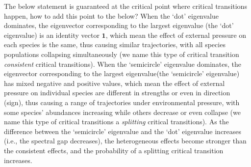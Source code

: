 \documentclass[a4paper,fleqn,12pt]{article}
\begin{document}
{\color{red}The below statement is guaranteed at the critical point where critical transitions happen, how to add this point to the below?}
When the `dot' eigenvalue dominates, the eigenvector corresponding to the largest eigenvalue (the `dot' eigenvalue) is an identity vector $\mathbf{1}$,
which mean the effect of external pressure on each species is the same,
thus causing similar trajectories, with all species populations collapsing simultaneously (we name this type of critical transition \textit{consistent} critical transitions).
When the `semicircle' eigenvalue dominates, the eigenvector corresponding to the largest eigenvalue(the `semicircle' eigenvalue) has mixed negative and positive values,
which mean the effect of external pressure on individual species are different in strengths or even in direction (sign),
thus causing a range of trajectories under environmental pressure,
with some species' abundances increasing while others decrease or even collapse (we name this type of critical transitions a \textit{splitting} critical transitions).
As the difference between the `semicircle' eigenvalue and the `dot' eigenvalue increases (i.e., the spectral gap decreases),
the heterogeneous effects become stronger than the consistent effects,
and the probability of a splitting critical transition increases.
\end{document}

